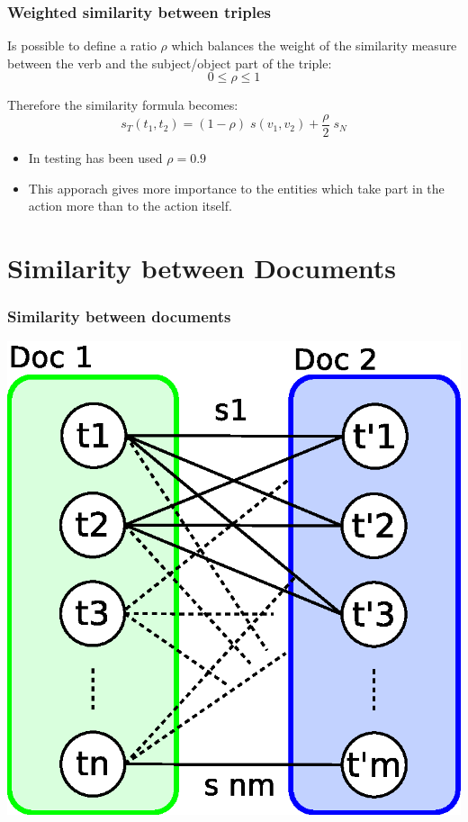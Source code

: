 \documentclass{beamer}
\begin{document}
\begin{frame}
\frametitle{Weighted similarity between triples}
Is possible to define a ratio $\rho$ which balances the weight of the
similarity measure between the verb and the subject/object part of the
triple:
$$
0 \leq \rho \leq 1
$$

Therefore the similarity formula becomes:
$$
s_{T}(t_{1}, t_{2}) = (1 - \rho) \; s (v_{1}, v_{2}) + \frac{\rho}{2} \; s_{N}
$$
\begin{itemize}
\item In testing has been used $\rho = 0.9$
\item This apporach gives more importance to the entities which take part in
the action more than to the action itself.
\end{itemize}
\end{frame}

\section{Similarity between Documents}
\begin{frame}
\frametitle{Similarity between documents}
\begin{center}
\includegraphics[scale=0.7]{imgs/sim_doc.eps}
\end{center}
\end{frame}
\end{document}
